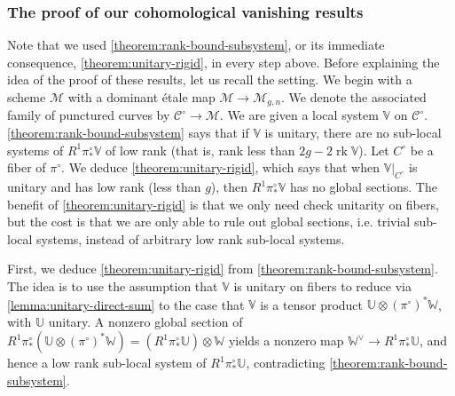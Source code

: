 \documentclass[12 pt]{amsart}
\theoremstyle{plain}
\theoremstyle{definition}
\theoremstyle{remark}
\numberwithin{equation}{section}
\DeclareMathOperator\rk{rk}
\begin{document}
\subsubsection{The proof of our cohomological vanishing results}
\label{subsubsection:rigidity-idea}
Note that we used \autoref{theorem:rank-bound-subsystem}, or its immediate consequence,
\autoref{theorem:unitary-rigid},
in every step above.
Before explaining the idea of the proof of these results, let us recall the
setting. We begin with a scheme $\mathscr M$ with a dominant \'etale map
$\mathscr M \to \mathscr M_{g,n}$.  We denote the associated family of punctured curves by $\mathscr
C^\circ \to \mathscr M$. We are given a local system $\mathbb V$ on $\mathscr C^\circ$.
\autoref{theorem:rank-bound-subsystem} says that if $\mathbb{V}$ is unitary,
there are no sub-local systems of $R^1 \pi^\circ_* \mathbb V$ of low rank (that is, rank less
than $2g - 2\rk \mathbb V$).
Let $C^\circ$ be a fiber of $\pi^\circ$.
We deduce \autoref{theorem:unitary-rigid}, which says that when $\mathbb
V|_{C^\circ}$
is unitary and has low rank (less than $g$), then $R^1 \pi^\circ_* \mathbb V$ has no global sections.
The benefit of \autoref{theorem:unitary-rigid} is that we only need check
unitarity on fibers, but the cost is that we are only able to rule out global
sections, i.e. trivial sub-local systems, instead of arbitrary low rank
sub-local systems.

First, we deduce \autoref{theorem:unitary-rigid} from
\autoref{theorem:rank-bound-subsystem}.
The idea is to use the assumption that
$\mathbb V$ is unitary on fibers to
reduce via \autoref{lemma:unitary-direct-sum} to the case that $\mathbb V$ is a
tensor product $\mathbb U \otimes (\pi^\circ)^* \mathbb W$, with $\mathbb{U}$ unitary. 
A nonzero global section of $R^1\pi^\circ_*(\mathbb U \otimes (\pi^\circ)^* \mathbb W)=(R^1\pi^\circ_*\mathbb{U})\otimes \mathbb{W}$ yields a nonzero map $\mathbb W^\vee \to R^1 \pi^\circ_* \mathbb U$, and hence a
low rank sub-local system of $R^1 \pi^\circ_* \mathbb U$, contradicting 
\autoref{theorem:rank-bound-subsystem}.
\end{document}
